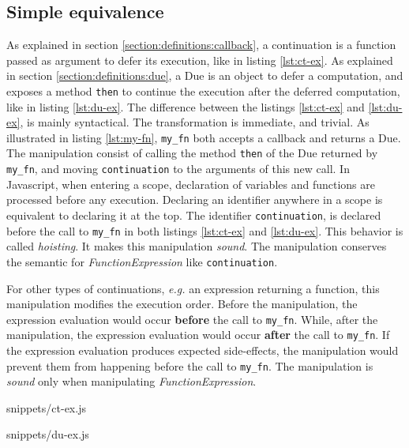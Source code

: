\subsection{Simple equivalence} \label{section:equivalences:general}

As explained in section \ref{section:definitions:callback}, a continuation is a function passed as argument to defer its execution, like in listing \ref{lst:ct-ex}.
As explained in section \ref{section:definitions:due}, a Due is an object to defer a computation, and exposes a method \texttt{then} to continue the execution after the deferred computation, like in listing \ref{lst:du-ex}.
The difference between the listings \ref{lst:ct-ex} and \ref{lst:du-ex}, is mainly syntactical.
The transformation is immediate, and trivial.
As illustrated in listing \ref{lst:my-fn}, \texttt{my_fn} both accepts a callback and returns a Due.
The manipulation consist of calling the method \texttt{then} of the Due returned by \texttt{my_fn}, and moving \texttt{continuation} to the arguments of this new call.
In Javascript, when entering a scope, declaration of variables and functions are processed before any execution.
Declaring an identifier anywhere in a scope is equivalent to declaring it at the top.
The identifier \texttt{continuation}, is declared before the call to \texttt{my_fn} in both listings \ref{lst:ct-ex} and \ref{lst:du-ex}.
This behavior is called \textit{hoisting}.
It makes this manipulation \textit{sound}.
The manipulation conserves the semantic for \textit{FunctionExpression} like \texttt{continuation}.

For other types of continuations, \textit{e.g.} an expression returning a function, this manipulation modifies the execution order.
Before the manipulation, the expression evaluation would occur \textbf{before} the call to \texttt{my_fn}.
While, after the manipulation, the expression evaluation would occur \textbf{after} the call to \texttt{my_fn}.
If the expression evaluation produces expected side-effects, the manipulation would prevent them from happening before the call to \texttt{my_fn}.
The manipulation is \textit{sound} only when manipulating \textit{FunctionExpression}.

             {snippets/ct-ex.js}

             {snippets/du-ex.js}


